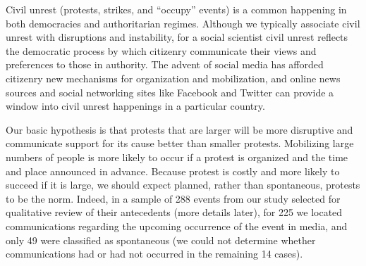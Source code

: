 Civil unrest (protests, strikes, and ``occupy'' events) is a common happening in both democracies
and authoritarian regimes.
Although we typically associate civil unrest with disruptions and instability, for a social scientist
civil unrest reflects the democratic process by 
which citizenry communicate their views and preferences to those in authority. 
The advent of social
media has afforded citizenry new mechanisms for organization and mobilization, and online news sources
and social networking sites like Facebook and Twitter
can provide a window into civil unrest happenings in a particular country.

Our basic hypothesis is that
protests that are larger will be more disruptive and communicate support for its cause better than smaller protests. 
Mobilizing large numbers of people is more likely to occur if a protest is organized and the time and place announced in
advance. Because protest is costly and more likely to succeed if it is large, we should expect planned, rather than 
spontaneous, protests to be the norm. Indeed, in a sample of 288 events from our study selected for qualitative review of their antecedents
(more details later), for 225 we located communications regarding the upcoming occurrence of the event in media, and only 49 were classified as 
spontaneous (we could not determine whether communications had or had not occurred in the remaining 14 cases).

